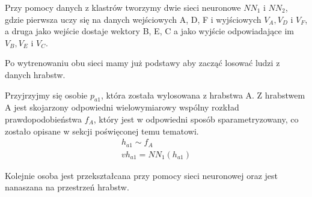 \documentclass[a4paper,12pt]{article}
\begin{document}
Przy pomocy danych z klastrów tworzymy dwie sieci neuronowe $NN_1$ i $NN_2$, gdzie pierwsza uczy się na danych wejściowych A, D, F i wyjściowych $V_A, V_D$ i $V_F$, a druga jako wejście dostaje wektory B, E, C a jako wyjście odpowiadające im $V_B, V_E$ i $V_C$.

Po wytrenowaniu obu sieci mamy już podstawy aby zacząć losować ludzi z danych hrabstw.

Przyjrzyjmy się osobie $p_{a1}$, która została wylosowana z hrabstwa A. Z hrabstwem A jest skojarzony odpowiedni wielowymiarowy wspólny rozkład prawdopodobieństwa $f_A$, który jest w odpowiedni sposób sparametryzowany, co zostało opisane w sekcji poświęconej temu tematowi.
\begin{equation}
    \begin{gathered}
        h_{a1} \sim f_A \\
        vh_{a1} = NN_1(h_{a1})
    \end{gathered}
\end{equation}

Kolejnie osoba jest przekształcana przy pomocy sieci neuronowej oraz jest nanaszana na przestrzeń hrabstw.

\begin{center}
\end{center}
\end{document}
